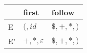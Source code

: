 \documentclass{standalone}
\providecommand\lightrule{%
	\arrayrulecolor{black!30}%
	\midrule[\lightrulewidth]%
	\arrayrulecolor{black}}
\begin{document}
\begin{tabularx}{\textwidth}{XXX}
    & first & follow \\
    \midrule
        E
        &
        \((, id\)
        &
        \(\$, +, \ast, )\)
        \\ \lightrule
        E'
        &
        \(+,\ast, \varepsilon\)
        &
        \(\$, +, \ast, )\)
\end{tabularx}
\end{document}
